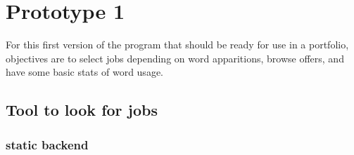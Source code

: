 \documentclass[11pt]{article}
\author{teddd}
\date{\today}
\title{}
\begin{document}
\tableofcontents

\section{Prototype 1}
\label{sec:org25a23be}
For this first version of the program that should be ready for use in a portfolio, objectives are to select jobs depending on word apparitions, browse offers, and have some basic stats of word usage.
\subsection{Tool to look for jobs}
\label{sec:orgee9390d}
\subsubsection{static backend}
\label{sec:orgee12e0a}
\end{document}
